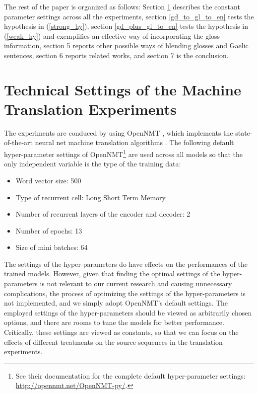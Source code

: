 \documentclass[11pt,a4paper]{article}
\begin{document}
The rest of the paper is organized as follows: Section \ref{sec:experimet_setting} describes the constant parameter settings across all the experiments, section \ref{gd_to_gl_to_en} tests the hypothesis in (\ref{strong_hy}), section \ref{gd_plus_gl_to_en} tests the hypothesis in (\ref{weak_hy}) and exemplifies an effective way of incorporating the gloss information, section 5 reports other possible ways of blending glosses and Gaelic sentences, section 6 reports related works, and section 7 is the conclusion. 


\section{Technical Settings of the Machine Translation Experiments}\label{sec:experimet_setting}
The experiments are conduced by using OpenNMT \citep{2017opennmt}, which implements the state-of-the-art neural net machine translation algorithms \citep{cho2014properties, cho2014learning, bahdanau2014neural}.
The following default hyper-parameter settings of OpenNMT\footnote{See their documentation for the complete default hyper-parameter settings: \url{http://opennmt.net/OpenNMT-py/}.} are used across all models so that the only independent variable is the type of the training data:
	\begin{itemize}
	\item Word vector size: 500
	\item Type of recurrent cell: Long Short Term Memory
	\item Number of recurrent layers of the encoder and decoder: 2
	\item Number of epochs: 13
	\item Size of mini batches: 64\\
	\end{itemize}

The settings of the hyper-parameters do have effects on the performances of the trained models.
However, given that finding the optimal settings of the hyper-parameters is not relevant to our current research and causing unnecessary complications, the process of optimizing the settings of the hyper-parameters is not implemented, and we simply adopt OpenNMT's default settings. The employed settings of the hyper-parameters should be viewed as arbitrarily chosen options, and there are rooms to tune the models for better performance. Critically, these settings are viewed as constants, so that we can focus on the effects of different treatments on the source sequences in the translation experiments.
\end{document}
